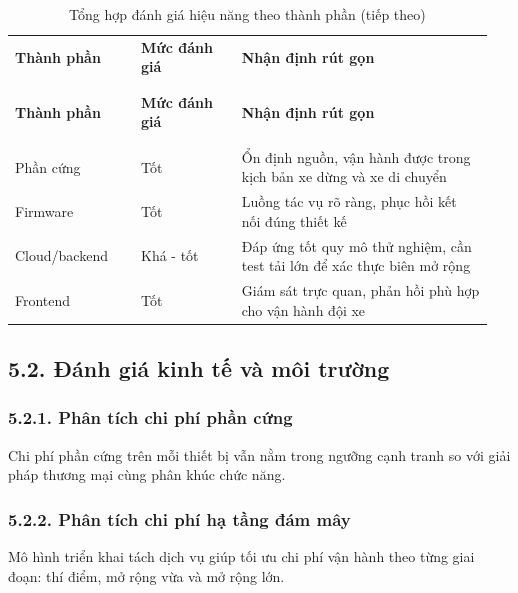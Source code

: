 \documentclass[a4paper]{extarticle}
\newcommand{\thesissettableid}[2]{%
  \renewcommand{\thetable}{#1}%
  \renewcommand{\theHtable}{#2}%
}
\begin{document}
{\thesissettableid{5.1}{tab-condensed-ch5-performance-summary}
\def\LTcaptype{table}
\begin{longtable}{|L{0.250\linewidth}|L{0.200\linewidth}|L{0.500\linewidth}|}
\caption{Tổng hợp đánh giá hiệu năng theo thành phần}\label{tab:condensed-ch5-performance-summary}\\
\hline \textbf{Thành phần} & \textbf{Mức đánh giá} & \textbf{Nhận định rút gọn} \\
\\\hline
\endfirsthead
\caption[]{Tổng hợp đánh giá hiệu năng theo thành phần (tiếp theo)}\\
\hline \textbf{Thành phần} & \textbf{Mức đánh giá} & \textbf{Nhận định rút gọn} \\
\\\hline
\endhead
\\\hline
\endfoot
\endlastfoot
Phần cứng & Tốt & Ổn định nguồn, vận hành được trong kịch bản xe dừng và xe di chuyển \\\hline
Firmware & Tốt & Luồng tác vụ rõ ràng, phục hồi kết nối đúng thiết kế \\\hline
Cloud/backend & Khá - tốt & Đáp ứng tốt quy mô thử nghiệm, cần test tải lớn để xác thực biên mở rộng \\\hline
Frontend & Tốt & Giám sát trực quan, phản hồi phù hợp cho vận hành đội xe \\\hline
\end{longtable}
}

\subsection{5.2. Đánh giá kinh tế và môi trường}

\subsubsection{5.2.1. Phân tích chi phí phần cứng}

Chi phí phần cứng trên mỗi thiết bị vẫn nằm trong ngưỡng cạnh tranh so với giải pháp thương mại cùng phân khúc chức năng.

\subsubsection{5.2.2. Phân tích chi phí hạ tầng đám mây}

Mô hình triển khai tách dịch vụ giúp tối ưu chi phí vận hành theo từng giai đoạn: thí điểm, mở rộng vừa và mở rộng lớn.
\end{document}
